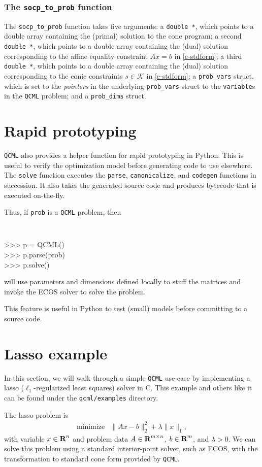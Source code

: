 \documentclass[11pt]{article}
\def\qcml{\texttt{QCML}\xspace}
\newcommand{\reals}{{\mbox{\bf R}}}
\begin{document}
\subsubsection{The {\tt socp\_to\_prob} function}
The {\tt socp\_to\_prob} function takes five arguments: a {\tt double *}, which
points to a double array containing the (primal) solution to the cone program;
a second {\tt double *}, which points to a double array containing the (dual) solution
corresponding to the
affine equality constraint $Ax=b$ in \eqref{e-stdform}; a third {\tt double *},
which points to a double array containing the (dual) solution corresponding
to the conic constraints $s \in \mathcal{K}$ in \eqref{e-stdform};
a {\tt prob\_vars} struct, which is set to
the \emph{pointers} in the underlying {\tt prob\_vars} struct to the
{\tt variable}s in the \qcml problem; and a {\tt prob\_dims} struct.


\section{Rapid prototyping}
\qcml also provides a helper function for rapid prototyping in Python. This
is useful to verify the optimization model before generating code to use
elsewhere. The {\tt solve} function executes the {\tt parse}, {\tt canonicalize},
and {\tt codegen} functions in succession. It also takes the generated source
code and produces bytecode that is executed on-the-fly.

Thus, if {\tt prob} is a \qcml problem, then
{\tt
\begin{tabbing}
  \qquad \= >>> p = QCML() \\
  \> >>> p.parse(prob) \\
  \> >>> p.solve()
\end{tabbing}
}
\noindent
will use parameters and dimensions defined locally to stuff the matrices and
invoke the ECOS solver to solve the problem.

This feature is useful in Python to test (small) models before committing to
a source code.

\section{Lasso example}
In this section, we will walk through a simple \qcml use-case by implementing
a lasso ($\ell_1$-regularized least squares) solver in C. This example
and others like it can be found under the {\tt qcml/examples} directory.

The lasso problem is
\[
\begin{array}{ll}
  \mbox{minimize} & \|Ax - b\|_2^2 + \lambda \|x\|_1,
\end{array}
\]
with variable $x \in \reals^n$ and problem data $A\in\reals^{m\times n}$,
$b \in \reals^m$, and $\lambda > 0$. We can solve this problem using a
standard interior-point solver, such as ECOS, with the transformation
to standard cone form provided by \qcml.
\end{document}
